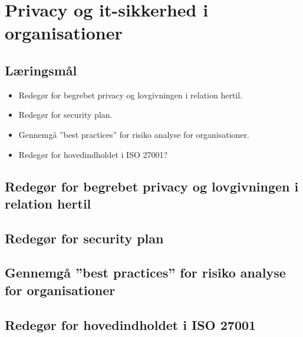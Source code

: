\section{Privacy og it-sikkerhed i organisationer}

\subsection{Læringsmål}

\begin{itemize}
	\item Redegør for begrebet privacy og lovgivningen i relation hertil.
	\item Redegør for security plan.
	\item Gennemgå ”best practices” for risiko analyse for organisationer.
	\item Redegør for hovedindholdet i ISO 27001?
\end{itemize}

\subsection{Redegør for begrebet privacy og lovgivningen i relation hertil}
\subsection{Redegør for security plan}
\subsection{Gennemgå ”best practices” for risiko analyse for organisationer}
\subsection{Redegør for hovedindholdet i ISO 27001}
